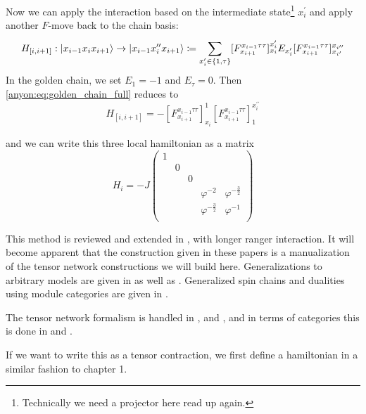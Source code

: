 Now we can apply the interaction based on the intermediate
state\footnote{Technically we need a projector here read up again.} $x_i^\prime$
and apply another $F$-move back to the chain basis:
$$
  H_{[i,i+1]} : 
  \left| x_{i-1} x_i x_{i+1}   \right\rangle \to \left| x_{i-1} x_i^{\prime\prime} x_{i+1}  \right\rangle 
  \coloneqq
  \sum_{x_i^\prime \in \{1,\tau\} }^{} [F_{x_{i+1} }^{x_{i-1}\tau\tau}]_{x_i}^{x_i^\prime } 
    E_{x_{i}^\prime } 
    [F_{x_{i+1} }^{x_{i-1}\tau\tau }]_{x_{i^\prime }}^{x_{i^{\prime\prime}}}
  \label{anyon:eq:golden_chain_full}
$$
In the golden chain, we set $E_{1} = -1$ and $E_{\tau} = 0$. Then \eqref{anyon:eq:golden_chain_full} reduces to
\[
  H_{[i,i+1]} = - [F_{x_{i+1}}^{x_{i-1}\tau\tau}]_{x_i}^1 [F_{x_{i+1}}^{x_{i-1}\tau\tau}]_{1}^{x_{i}^{\prime\prime}}
\]

and we can write this three local hamiltonian as a matrix 
\[
  H_i = -J \begin{pmatrix}
    1 &  &  &  &   \\
     & 0 &  &  &   \\
     &  & 0 &  &   \\
     &  &  & \varphi^{-2}  & \varphi^{-\frac{3}{2}}  \\
     &  &  & \varphi^{-\frac{3}{2}} & \varphi^{-1}    \\
  \end{pmatrix}
\]


This method is reviewed and extended in
\cite{trebstShortIntroductionFibonacci2008a}, with longer ranger interaction. It
will become apparent that the construction given in these papers is a
manualization of the tensor network constructions we will build here.
Generalizations to arbitrary models are given in
\cite{gilsAnyonicQuantumSpin2013} as well as
\cite{buicanAnyonicChainsTopological2017}. Generalized spin chains and dualities
using module categories are given in \cite{eckQuantumLatticeModels2025}.

The tensor network formalism is handled in
\cite{pfeiferSimulationAnyonsTensor2010},
\cite{pfeiferSimulationAnyonsUsing2012} and
\cite{ayeniStudiesBraidedNonAbelian2017}, and in terms of categories this is
done in \cite{dissertation} and \cite{devosTensorKitjlJuliaPackage2025}.


If we want to write this as a tensor contraction, we first define a hamiltonian
in a similar fashion to chapter 1. 

